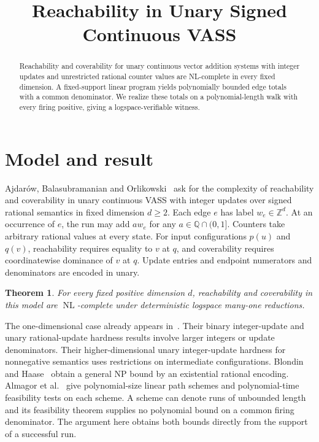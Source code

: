 \documentclass[a4paper,11pt]{amsart}
\date{}
\title{Reachability in Unary Signed Continuous VASS}
\newtheorem{thm}{Theorem}
\DeclareMathOperator{\NL}{NL}
\begin{document}
\begin{abstract}
Reachability and coverability for unary continuous vector addition systems with integer updates and unrestricted rational counter values are NL-complete in every fixed dimension. A fixed-support linear program yields polynomially bounded edge totals with a common denominator. We realize these totals on a polynomial-length walk with every firing positive, giving a logspace-verifiable witness.
\end{abstract}
\maketitle
\section{Model and result}
Ajdar\'ow, Balasubramanian and Orlikowski~\cite[\S6]{abo} ask for the complexity of reachability and coverability in unary continuous VASS with integer updates over signed rational semantics in fixed dimension $d\ge2$. Each edge $e$ has label $w_e\in\mathbb Z^d$. At an occurrence of $e$, the run may add $a w_e$ for any $a\in\mathbb Q\cap(0,1]$. Counters take arbitrary rational values at every state. For input configurations $p(u)$ and $q(v)$, reachability requires equality to $v$ at $q$, and coverability requires coordinatewise dominance of $v$ at $q$. Update entries and endpoint numerators and denominators are encoded in unary.
\begin{thm}
For every fixed positive dimension $d$, reachability and coverability in this model are $\NL$-complete under deterministic logspace many-one reductions.
\end{thm}
The one-dimensional case already appears in~\cite[Theorem~3]{abo}. Their binary integer-update and unary rational-update hardness results involve larger integers or update denominators. Their higher-dimensional unary integer-update hardness for nonnegative semantics uses restrictions on intermediate configurations. Blondin and Haase~\cite[\S IV.B]{bh} obtain a general NP bound by an existential rational encoding. Almagor et al.~\cite[Theorems~11 and~13]{geom} give polynomial-size linear path schemes and polynomial-time feasibility tests on each scheme. A scheme can denote runs of unbounded length and its feasibility theorem supplies no polynomial bound on a common firing denominator. The argument here obtains both bounds directly from the support of a successful run.
\end{document}
